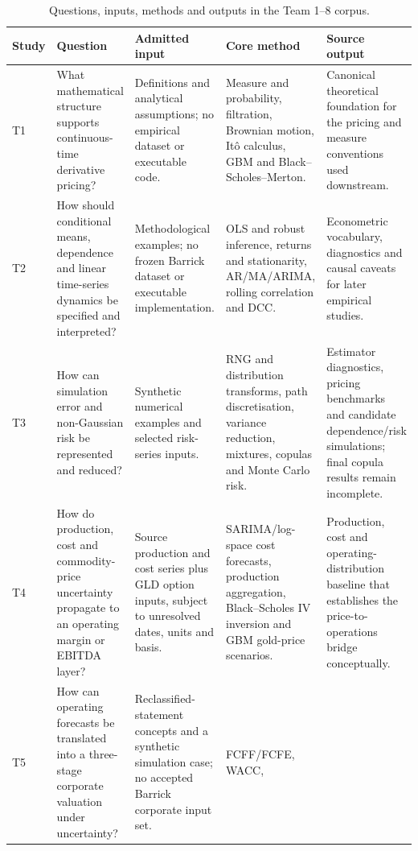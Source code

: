 \begin{table}[H]
\centering
\caption{Questions, inputs, methods and outputs in the Team 1--8 corpus.}
\label{tab:team-question-model-output}
\scriptsize
\setlength{\tabcolsep}{3pt}
\renewcommand{\arraystretch}{1.10}
\begin{tabularx}{\textwidth}{@{}p{0.85cm}p{2.32cm}X X X@{}}
\toprule
\textbf{Study} & \textbf{Question} & \textbf{Admitted input} &
\textbf{Core method} & \textbf{Source output} \\
\midrule
T1 & What mathematical structure supports continuous-time derivative pricing?
& Definitions and analytical assumptions; no empirical dataset or executable
code. & Measure and probability, filtration, Brownian motion, It\^o calculus,
GBM and Black--Scholes--Merton. & Canonical theoretical foundation for the
pricing and measure conventions used downstream. \\
T2 & How should conditional means, dependence and linear time-series dynamics
be specified and interpreted? & Methodological examples; no frozen Barrick
dataset or executable implementation. & OLS and robust inference, returns and
stationarity, AR/MA/ARIMA, rolling correlation and DCC. & Econometric vocabulary,
diagnostics and causal caveats for later empirical studies. \\
T3 & How can simulation error and non-Gaussian risk be represented and reduced?
& Synthetic numerical examples and selected risk-series inputs. & RNG and
distribution transforms, path discretisation, variance reduction, mixtures,
copulas and Monte Carlo risk. & Estimator diagnostics, pricing benchmarks and
candidate dependence/risk simulations; final copula results remain incomplete. \\
T4 & How do production, cost and commodity-price uncertainty propagate to an
operating margin or EBITDA layer? & Source production and cost series plus GLD
option inputs, subject to unresolved dates, units and basis. & SARIMA/log-space
cost forecasts, production aggregation, Black--Scholes IV inversion and GBM
gold-price scenarios. & Production, cost and operating-distribution baseline
that establishes the price-to-operations bridge conceptually. \\
T5 & How can operating forecasts be translated into a three-stage corporate
valuation under uncertainty? & Reclassified-statement concepts and a synthetic
simulation case; no accepted Barrick corporate input set. & FCFF/FCFE, WACC,

\end{tabularx}
\end{table}
